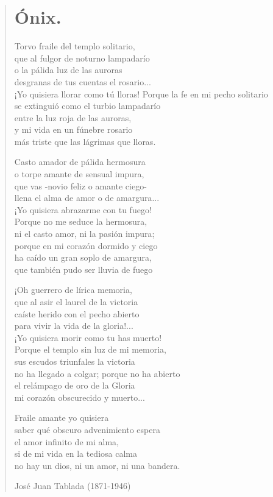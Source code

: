 \documentclass[12pt, twoside]{book}
\begin{document}
\begin{verse}
\begin{center}
\section{Ónix.}
\end{center}
Torvo fraile del templo solitario,\\
que al fulgor de noturno lampadarío\\
o la pálida luz de las auroras\\
desgranas de tus cuentas el rosario...\\
¡Yo quisiera llorar como tú lloras!
Porque la fe en mi pecho solitario\\
se extinguió como el turbio lampadarío\\
entre la luz roja de las auroras,\\
y mi vida en un fúnebre rosario\\
más triste que las lágrimas que lloras.
\newline

Casto amador de pálida hermosura\\
o torpe amante de sensual impura,\\
que vas -novio feliz o amante ciego-\\
llena el alma de amor o de amargura...\\
¡Yo quisiera abrazarme con tu fuego!\\
Porque no me seduce la hermosura,\\
ni el casto amor, ni la pasión impura;\\
porque en mi corazón dormido y ciego\\
ha caído un gran soplo de amargura,\\
que también pudo ser lluvia de fuego
\newline

¡Oh guerrero de lírica memoria,\\
que al asir el laurel de la victoria\\
caíste herido con el pecho abierto\\
para vivir la vida de la gloria!...\\
¡Yo quisiera morir como tu has muerto!\\
Porque el templo sin luz de mi memoria,\\
sus escudos triunfales la victoria\\
no ha llegado a colgar; porque no ha abierto\\
el relámpago de oro de la Gloria\\
mi corazón obscurecido y muerto...
\newpage

Fraile amante yo quisiera\\
saber qué obscuro advenimiento espera\\
el amor infinito de mi alma,\\
si de mi vida en la tediosa calma\\
no hay un dios, ni un amor, ni una bandera.
\newline

José Juan Tablada (1871-1946)
\end{verse}
\newpage
\end{document}
